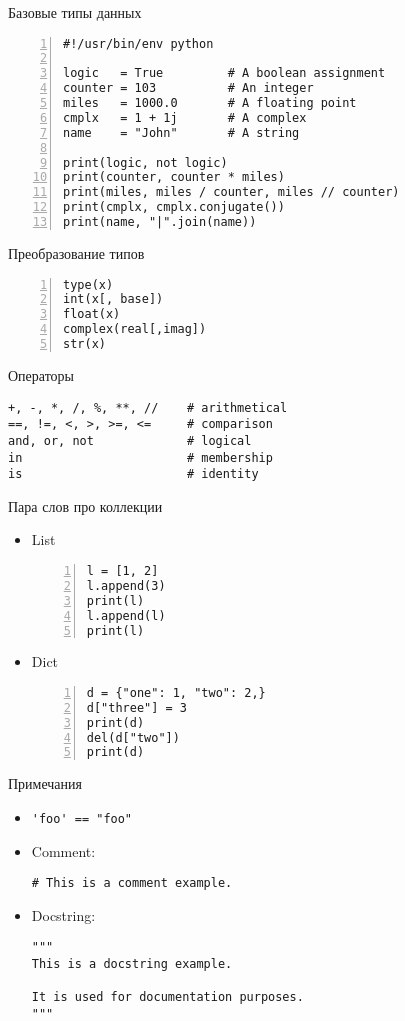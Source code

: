 \documentclass[hyperref={pdftex,unicode}]{beamer}
\begin{document}
\begin{frame}[fragile]{Базовые типы данных}
  \begin{lstlisting}[numbers=left]
#!/usr/bin/env python

logic   = True         # A boolean assignment
counter = 103          # An integer
miles   = 1000.0       # A floating point
cmplx   = 1 + 1j       # A complex
name    = "John"       # A string

print(logic, not logic)
print(counter, counter * miles)
print(miles, miles / counter, miles // counter)
print(cmplx, cmplx.conjugate())
print(name, "|".join(name))
\end{lstlisting}
\end{frame}

\begin{frame}[fragile]{Преобразование типов}
  \begin{lstlisting}[numbers=left]
type(x)
int(x[, base])
float(x)
complex(real[,imag])
str(x)
\end{lstlisting}
\end{frame}

\begin{frame}[fragile]{Операторы}
\begin{lstlisting}
+, -, *, /, %, **, //    # arithmetical
==, !=, <, >, >=, <=     # comparison
and, or, not             # logical
in                       # membership
is                       # identity
\end{lstlisting}
\end{frame}

\begin{frame}[fragile]{Пара слов про коллекции}
  \begin{itemize}
  \item<1-> List
    \begin{lstlisting}[numbers=left]
l = [1, 2]
l.append(3)
print(l)
l.append(l)
print(l)
    \end{lstlisting}
  \item<2-> Dict
    \begin{lstlisting}[numbers=left]
d = {"one": 1, "two": 2,}
d["three"] = 3
print(d)
del(d["two"])
print(d)
    \end{lstlisting}
  \end{itemize}
\end{frame}

\begin{frame}[fragile]{Примечания}
  \begin{itemize}
    \item \lstinline$'foo' == "foo"$

    \item Comment:
      \begin{lstlisting}
# This is a comment example.
      \end{lstlisting}

    \item Docstring:
      \begin{lstlisting}
"""
This is a docstring example.

It is used for documentation purposes.
"""
      \end{lstlisting}
  \end{itemize}
\end{frame}
\end{document}
